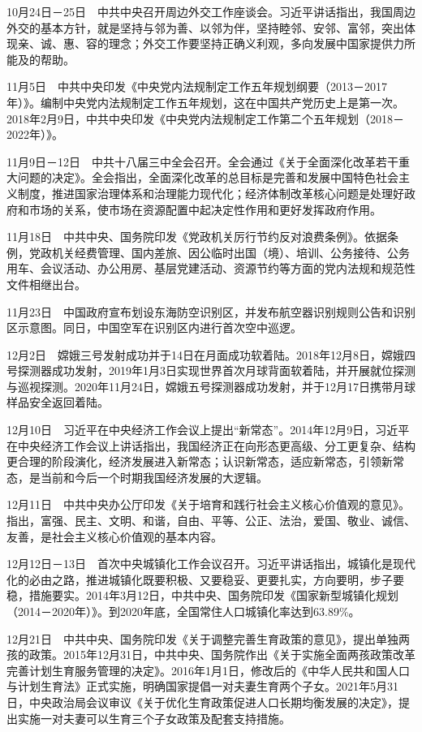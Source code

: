 \documentclass[10pt,a4paper,twocolumn]{book}
\begin{document}
10月24日－25日　中共中央召开周边外交工作座谈会。习近平讲话指出，我国周边外交的基本方针，就是坚持与邻为善、以邻为伴，坚持睦邻、安邻、富邻，突出体现亲、诚、惠、容的理念；外交工作要坚持正确义利观，多向发展中国家提供力所能及的帮助。

11月5日　中共中央印发《中央党内法规制定工作五年规划纲要（2013－2017年）》。编制中央党内法规制定工作五年规划，这在中国共产党历史上是第一次。2018年2月9日，中共中央印发《中央党内法规制定工作第二个五年规划（2018－2022年）》。

11月9日－12日　中共十八届三中全会召开。全会通过《关于全面深化改革若干重大问题的决定》。全会指出，全面深化改革的总目标是完善和发展中国特色社会主义制度，推进国家治理体系和治理能力现代化；经济体制改革核心问题是处理好政府和市场的关系，使市场在资源配置中起决定性作用和更好发挥政府作用。

11月18日　中共中央、国务院印发《党政机关厉行节约反对浪费条例》。依据条例，党政机关经费管理、国内差旅、因公临时出国（境）、培训、公务接待、公务用车、会议活动、办公用房、基层党建活动、资源节约等方面的党内法规和规范性文件相继出台。

11月23日　中国政府宣布划设东海防空识别区，并发布航空器识别规则公告和识别区示意图。同日，中国空军在识别区内进行首次空中巡逻。

12月2日　嫦娥三号发射成功并于14日在月面成功软着陆。2018年12月8日，嫦娥四号探测器成功发射，2019年1月3日实现世界首次月球背面软着陆，并开展就位探测与巡视探测。2020年11月24日，嫦娥五号探测器成功发射，并于12月17日携带月球样品安全返回着陆。

12月10日　习近平在中央经济工作会议上提出“新常态”。2014年12月9日，习近平在中央经济工作会议上讲话指出，我国经济正在向形态更高级、分工更复杂、结构更合理的阶段演化，经济发展进入新常态；认识新常态，适应新常态，引领新常态，是当前和今后一个时期我国经济发展的大逻辑。

12月11日　中共中央办公厅印发《关于培育和践行社会主义核心价值观的意见》。指出，富强、民主、文明、和谐，自由、平等、公正、法治，爱国、敬业、诚信、友善，是社会主义核心价值观的基本内容。

12月12日－13日　首次中央城镇化工作会议召开。习近平讲话指出，城镇化是现代化的必由之路，推进城镇化既要积极、又要稳妥、更要扎实，方向要明，步子要稳，措施要实。2014年3月12日，中共中央、国务院印发《国家新型城镇化规划（2014－2020年）》。到2020年底，全国常住人口城镇化率达到63.89\%。

12月21日　中共中央、国务院印发《关于调整完善生育政策的意见》，提出单独两孩的政策。2015年12月31日，中共中央、国务院作出《关于实施全面两孩政策改革完善计划生育服务管理的决定》。2016年1月1日，修改后的《中华人民共和国人口与计划生育法》正式实施，明确国家提倡一对夫妻生育两个子女。2021年5月31日，中央政治局会议审议《关于优化生育政策促进人口长期均衡发展的决定》，提出实施一对夫妻可以生育三个子女政策及配套支持措施。
\end{document}
